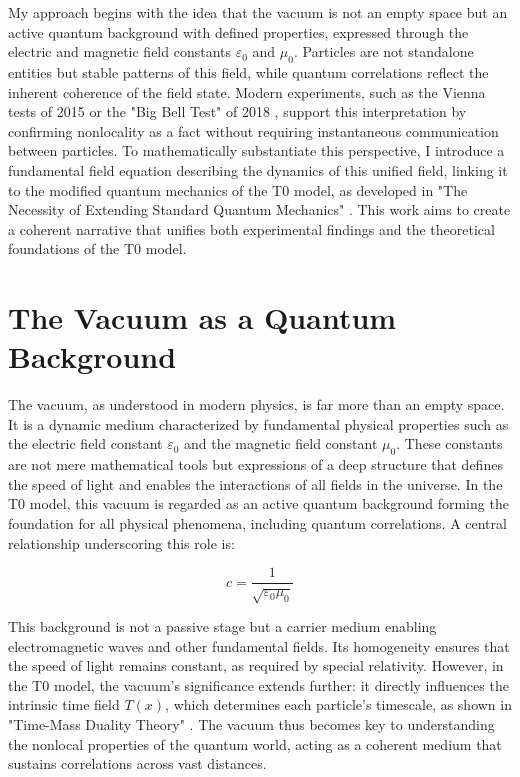 \documentclass[a4paper,12pt]{article}
\newcommand{\Tfield}{T(x)}
\theoremstyle{definition}
\theoremstyle{remark}
\begin{document}
	My approach begins with the idea that the vacuum is not an empty space but an active quantum background with defined properties, expressed through the electric and magnetic field constants \(\varepsilon_0\) and \(\mu_0\). Particles are not standalone entities but stable patterns of this field, while quantum correlations reflect the inherent coherence of the field state. Modern experiments, such as the Vienna tests of 2015 \cite{Giustina2015} or the "Big Bell Test" of 2018 \cite{BigBellTest2018}, support this interpretation by confirming nonlocality as a fact without requiring instantaneous communication between particles. To mathematically substantiate this perspective, I introduce a fundamental field equation describing the dynamics of this unified field, linking it to the modified quantum mechanics of the T0 model, as developed in "The Necessity of Extending Standard Quantum Mechanics" \cite{pascher_quantum_2025}. This work aims to create a coherent narrative that unifies both experimental findings and the theoretical foundations of the T0 model.
	
	\section{The Vacuum as a Quantum Background}
	
	The vacuum, as understood in modern physics, is far more than an empty space. It is a dynamic medium characterized by fundamental physical properties such as the electric field constant \(\varepsilon_0\) and the magnetic field constant \(\mu_0\). These constants are not mere mathematical tools but expressions of a deep structure that defines the speed of light and enables the interactions of all fields in the universe. In the T0 model, this vacuum is regarded as an active quantum background forming the foundation for all physical phenomena, including quantum correlations. A central relationship underscoring this role is:
	
	\begin{equation}
		c = \frac{1}{\sqrt{\varepsilon_0 \mu_0}}
	\end{equation}
	
	This background is not a passive stage but a carrier medium enabling electromagnetic waves and other fundamental fields. Its homogeneity ensures that the speed of light remains constant, as required by special relativity. However, in the T0 model, the vacuum's significance extends further: it directly influences the intrinsic time field \(\Tfield\), which determines each particle's timescale, as shown in "Time-Mass Duality Theory" \cite{pascher_params_2025}. The vacuum thus becomes key to understanding the nonlocal properties of the quantum world, acting as a coherent medium that sustains correlations across vast distances.
	
\end{document}
